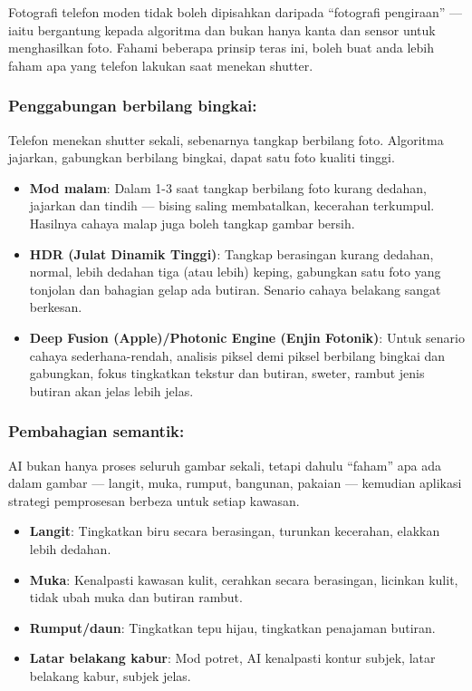 
Fotografi telefon moden tidak boleh dipisahkan daripada “fotografi pengiraan” — iaitu bergantung kepada algoritma dan bukan hanya kanta dan sensor untuk menghasilkan foto. Fahami beberapa prinsip teras ini, boleh buat anda lebih faham apa yang telefon lakukan saat menekan shutter.

\subsubsection*{Penggabungan berbilang bingkai:}

Telefon menekan shutter sekali, sebenarnya tangkap berbilang foto. Algoritma jajarkan, gabungkan berbilang bingkai, dapat satu foto kualiti tinggi.

\begin{itemize}
  \item \textbf{Mod malam}: Dalam 1-3 saat tangkap berbilang foto kurang dedahan, jajarkan dan tindih — bising saling membatalkan, kecerahan terkumpul. Hasilnya cahaya malap juga boleh tangkap gambar bersih.
  \item \textbf{HDR (Julat Dinamik Tinggi)}: Tangkap berasingan kurang dedahan, normal, lebih dedahan tiga (atau lebih) keping, gabungkan satu foto yang tonjolan dan bahagian gelap ada butiran. Senario cahaya belakang sangat berkesan.
  \item \textbf{Deep Fusion (Apple)/Photonic Engine (Enjin Fotonik)}: Untuk senario cahaya sederhana-rendah, analisis piksel demi piksel berbilang bingkai dan gabungkan, fokus tingkatkan tekstur dan butiran, sweter, rambut jenis butiran akan jelas lebih jelas.
\end{itemize}

\subsubsection*{Pembahagian semantik:}

AI bukan hanya proses seluruh gambar sekali, tetapi dahulu “faham” apa ada dalam gambar — langit, muka, rumput, bangunan, pakaian — kemudian aplikasi strategi pemprosesan berbeza untuk setiap kawasan.

\begin{itemize}
  \item \textbf{Langit}: Tingkatkan biru secara berasingan, turunkan kecerahan, elakkan lebih dedahan.
  \item \textbf{Muka}: Kenalpasti kawasan kulit, cerahkan secara berasingan, licinkan kulit, tidak ubah muka dan butiran rambut.
  \item \textbf{Rumput/daun}: Tingkatkan tepu hijau, tingkatkan penajaman butiran.
  \item \textbf{Latar belakang kabur}: Mod potret, AI kenalpasti kontur subjek, latar belakang kabur, subjek jelas.
\end{itemize}

